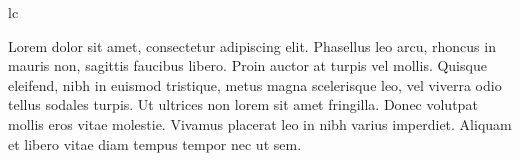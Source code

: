 \documentclass{article}
\begin{document}
lc
\newpage

\beginnumbering
\pstart
{}Lorem  dolor sit amet, consectetur adipiscing elit. Phasellus leo arcu, rhoncus in mauris non, sagittis faucibus libero. Proin auctor at turpis vel mollis. Quisque eleifend, nibh in euismod tristique, metus magna scelerisque leo, vel viverra odio tellus sodales turpis. Ut ultrices non lorem sit amet fringilla. Donec volutpat mollis eros vitae molestie. Vivamus placerat leo in nibh varius imperdiet. Aliquam et libero vitae diam tempus tempor nec ut sem.
\pend

\end{document}
